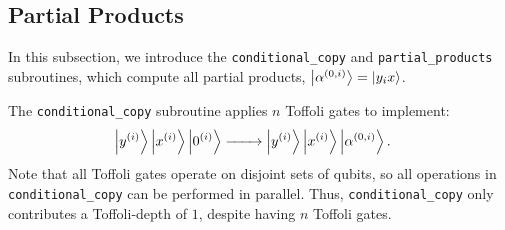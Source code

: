 \documentclass[reprint,amsmath,amssymb,aps,pra]{revtex4-2}
\begin{document}
\subsection{Partial Products}\label{subsec:partial_prod}

In this subsection, we introduce the \texttt{conditional\_copy} and \texttt{partial\_products} subroutines,
which compute all partial products, $\ket{\alpha^{(0,i)}}  = \ket{y_ix}$.

The \texttt{conditional\_copy} subroutine applies $n$ Toffoli gates to implement:
\begin{align}
\ket{y^{(i)}}\ket{x^{(i)}}\ket{0^{(i)}}
&\xrightarrow[\qquad]{} \ket{y^{(i)}}\ket{x^{(i)}}\ket{\alpha^{(0,i)}}.
\end{align}
Note that all Toffoli gates operate on disjoint sets of qubits, so all
operations in \texttt{conditional\_copy} can be performed in parallel. 
Thus, \texttt{conditional\_copy} only contributes a Toffoli-depth of $1$, despite having $n$ Toffoli gates.
\end{document}
